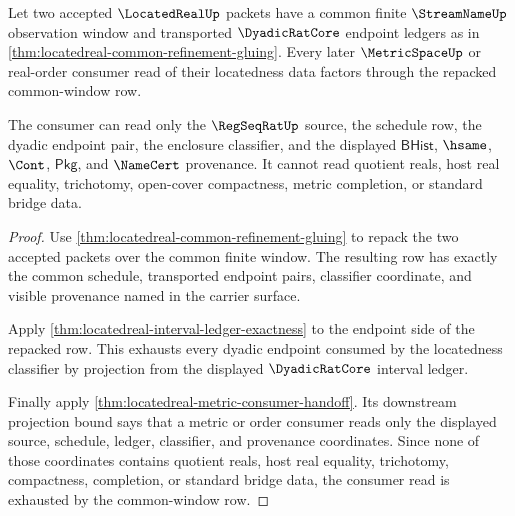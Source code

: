 \begin{theorem}
\label{thm:locatedreal-common-refinement-consumer-exactness}
Let two accepted $\LocatedRealUp$ packets have a common finite $\StreamNameUp$ observation window and transported $\DyadicRatCore$ endpoint ledgers as in \autoref{thm:locatedreal-common-refinement-gluing}. Every later $\MetricSpaceUp$ or real-order consumer read of their locatedness data factors through the repacked common-window row.

The consumer can read only the $\RegSeqRatUp$ source, the schedule row, the dyadic endpoint pair, the enclosure classifier, and the displayed $\mathsf{BHist}$, $\hsame$, $\Cont$, $\mathsf{Pkg}$, and $\NameCert$ provenance. It cannot read quotient reals, host real equality, trichotomy, open-cover compactness, metric completion, or standard bridge data.
\end{theorem}
\begin{proof}
Use \autoref{thm:locatedreal-common-refinement-gluing} to repack the two accepted packets over the common finite window. The resulting row has exactly the common schedule, transported endpoint pairs, classifier coordinate, and visible provenance named in the carrier surface.

Apply \autoref{thm:locatedreal-interval-ledger-exactness} to the endpoint side of the repacked row. This exhausts every dyadic endpoint consumed by the locatedness classifier by projection from the displayed $\DyadicRatCore$ interval ledger.

Finally apply \autoref{thm:locatedreal-metric-consumer-handoff}. Its downstream projection bound says that a metric or order consumer reads only the displayed source, schedule, ledger, classifier, and provenance coordinates. Since none of those coordinates contains quotient reals, host real equality, trichotomy, compactness, completion, or standard bridge data, the consumer read is exhausted by the common-window row.
\end{proof}

